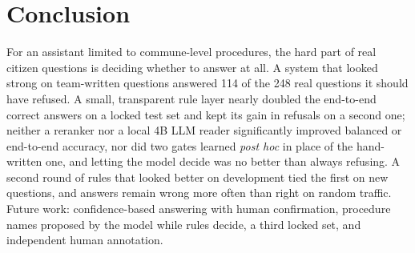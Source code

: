 \section{Conclusion}

For an assistant limited to commune-level procedures, the hard part of real citizen questions is deciding whether to answer at all. A
system that looked strong on team-written questions answered 114 of the 248 real questions it should have refused. A small, transparent
rule layer nearly doubled the end-to-end correct answers on a locked test set and kept its gain in refusals on a second one; neither a
reranker nor a local 4B LLM reader significantly improved balanced or end-to-end accuracy, nor did two gates learned \emph{post hoc} in place
of the hand-written one, and letting the model decide was no better than always refusing. A second round of rules that looked better on
development tied the first on new questions, and answers remain wrong
more often than right on random traffic. Future work: confidence-based answering with human confirmation, procedure names proposed by
the model while rules decide, a third locked set, and independent human annotation.
